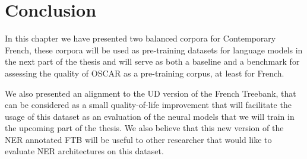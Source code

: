 \section{Conclusion}
In this chapter we have presented two balanced corpora for Contemporary French, these corpora will be used as pre-training datasets for language models in the next part of the thesis and will serve as both a baseline and a benchmark for assessing the quality of OSCAR as a pre-training corpus, at least for French.

We also presented an alignment to the UD version of the French Treebank, that can be considered as a small quality-of-life improvement that will facilitate the usage of this dataset as an evaluation of the neural models that we will train in the upcoming part of the thesis. We also believe that this new version of the NER annotated FTB will be useful to other researcher that would like to evaluate NER architectures on this dataset.
